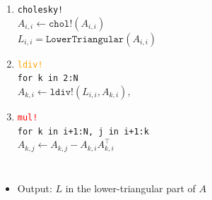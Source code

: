 \documentclass{beamer}
\begin{document}
\begin{frame}
\begin{columns}
   \medskip   
   \center {}
   \center {}
    
    \begin{enumerate}
      \item<2-> \textcolor{themegreen}{\texttt{cholesky!}} \\
      $A_{i,i} \leftarrow \texttt{chol!}(A_{i,i})$ \\
      $L_{i,i} = \texttt{LowerTriangular}(A_{i,i})$
      \item<3-> \textcolor{orange}{\texttt{ldiv!}} \\
      \texttt{for k in 2:N}\\
      \quad $A_{k,i} \leftarrow \texttt{ldiv!}(L_{i,i}, A_{k,i}),$
      \item<4-> \textcolor{red}{\texttt{mul!}} \\
      \texttt{for k in i+1:N, j in i+1:k}\\
      \quad $A_{k,j} \leftarrow A_{k,j} - A_{k,i}A^\top_{k,i}$
    \end{enumerate}
  \end{columns}
  
  \bigskip
  \begin{itemize}  
    \item<6-> Output: $L$ in the lower-triangular part of $A$
  \end{itemize}

\end{frame}
\end{document}
